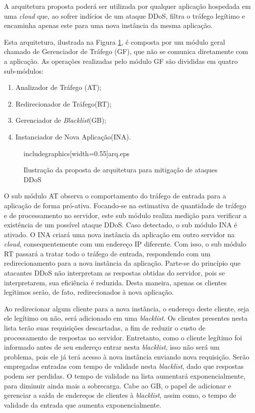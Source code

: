 \documentclass[a4paper, 12pt]{article}
\begin{document}
A arquitetura proposta poderá ser utilizada por qualquer aplicação hospedada em uma \emph{cloud} que, ao sofrer indícios de um ataque DDoS, filtra o tráfego legítimo e encaminha apenas este para uma nova instância da mesma aplicação. 

Esta arquitetura, ilustrada na Figura \ref{fig:arq}, é composta por um módulo geral chamado de Gerenciador de Tráfego (GF), que não se comunica diretamente com a aplicação. As operações realizadas pelo módulo GF são divididas em quatro sub-módulos:

\begin{enumerate}[i]
  \item Analizador de Tráfego (AT);
  \item Redirecionador de Tráfego(RT);
  \item Gerenciador de \emph{Blacklist}(GB);
  \item Instanciador de Nova Aplicação(INA).
\end{enumerate}

\begin{figure}[b!]
\centering
includegraphics[width=0.55\textwidth]{arq.eps}
\caption{Ilustração da proposta de arquitetura para mitigação de ataques DDoS}
\label{fig:arq}
\end{figure}



O sub módulo AT observa o comportamento do tráfego de entrada para a aplicação de forma pró-ativa. Focando-se na estimativa de quantidade de tráfego e de processamento no servidor, este sub módulo realiza medição para verificar a existência de um possível ataque DDoS. Caso detectado, o sub módulo INA é ativado. O INA criará uma nova instância da aplicação em outro servidor na \emph{cloud}, consequentemente com um endereço IP diferente. Com isso, o sub módulo RT passará a tratar todo o tráfego de entrada, respondendo com um redirecionamento para a nova instância da aplicação. Parte-se do princípio que atacantes DDoS não interpretam as respostas obtidas do servidor, pois se interpretarem, sua eficiência é reduzida. Desta maneira, apenas os clientes legítimos serão, de fato, redirecionados à nova aplicação.

Ao redirecionar algum cliente para a nova instância, o endereço deste cliente, seja ele legítimo ou não, será adicionado em uma \emph{blacklist}. Os clientes presentes nesta lista terão suas requisições descartadas, a fim de reduzir o custo de processamento de respostas no servidor. Entretanto, como o cliente legítimo foi informado antes de seu endereço entrar nesta \emph{blacklist}, isso não será um problema, pois ele já terá acesso à nova instância enviando nova requisição. Serão empregadas entradas com tempo de validade nesta \emph{blacklist}, dado que respostas podem ser perdidas. O tempo de validade na lista aumentará exponencialmente, para diminuir ainda mais a sobrecarga. Cabe ao GB, o papel de adicionar e gerenciar a saída de endereços de clientes à \emph{blacklist}, assim como, o tempo de validade da entrada que aumenta exponencialmente.
\end{document}

